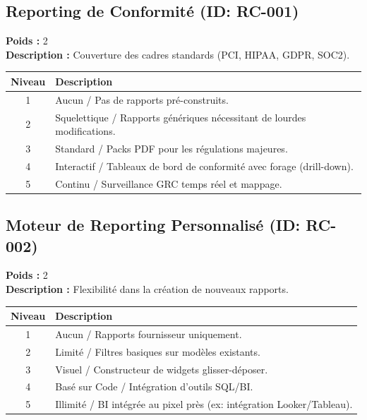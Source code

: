 \documentclass{article}
\begin{document}
\subsection{Reporting de Conformité (ID: RC-001)}
\textbf{Poids :} 2 \\
\textbf{Description :} Couverture des cadres standards (PCI, HIPAA, GDPR, SOC2).
\vspace{0.3cm}
\begin{longtable}{|c|p{12cm}|}
\hline
\rowcolor{lightgray} \textbf{Niveau} & \textbf{Description} \\ \hline
1 & Aucun / Pas de rapports pré-construits. \\ \hline
2 & Squelettique / Rapports génériques nécessitant de lourdes modifications. \\ \hline
3 & Standard / Packs PDF pour les régulations majeures. \\ \hline
4 & Interactif / Tableaux de bord de conformité avec forage (drill-down). \\ \hline
5 & Continu / Surveillance GRC temps réel et mappage. \\ \hline
\end{longtable}
\vspace{0.5cm}
\subsection{Moteur de Reporting Personnalisé (ID: RC-002)}
\textbf{Poids :} 2 \\
\textbf{Description :} Flexibilité dans la création de nouveaux rapports.
\vspace{0.3cm}
\begin{longtable}{|c|p{12cm}|}
\hline
\rowcolor{lightgray} \textbf{Niveau} & \textbf{Description} \\ \hline
1 & Aucun / Rapports fournisseur uniquement. \\ \hline
2 & Limité / Filtres basiques sur modèles existants. \\ \hline
3 & Visuel / Constructeur de widgets glisser-déposer. \\ \hline
4 & Basé sur Code / Intégration d'outils SQL/BI. \\ \hline
5 & Illimité / BI intégrée au pixel près (ex: intégration Looker/Tableau). \\ \hline
\end{longtable}
\vspace{0.5cm}
\end{document}
